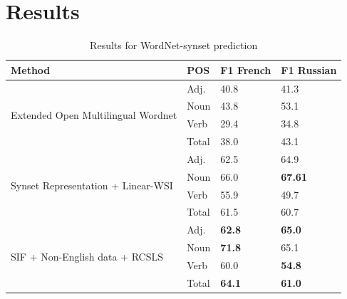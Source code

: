\documentclass[11pt,a4paper]{article}
\begin{document}
\section{Results}

\begin{table}[h]
	\small
	\caption{Results for WordNet-synset prediction}
	\label{wordnet-results}		
	\centering
	\begin{tabular}{l l l l}
		Method & POS & F1 French & F1 Russian
		\\
		\hline
		\multirow{4}{*}{Extended Open Multilingual Wordnet \cite{bond-wordnet}}
		& \multicolumn{1}{l}{Adj.} & \multicolumn{1}{l}{40.8} & \multicolumn{1}{l}{41.3} \\
		& \multicolumn{1}{l}{Noun} & \multicolumn{1}{l}{43.8} & \multicolumn{1}{l}{53.1} \\
		& \multicolumn{1}{l}{Verb} & \multicolumn{1}{l}{29.4} & \multicolumn{1}{l}{34.8} \\
		& \multicolumn{1}{l}{Total} & \multicolumn{1}{l}{38.0} & \multicolumn{1}{l}{43.1} \\
		\hline
		\multirow{4}{*}{Synset Representation + Linear-WSI \cite{Khodak2017}}
		& \multicolumn{1}{l}{Adj.} & \multicolumn{1}{l}{62.5} & \multicolumn{1}{l}{64.9} \\
		& \multicolumn{1}{l}{Noun} & \multicolumn{1}{l}{66.0} & \multicolumn{1}{l}{\textbf{67.61}} \\
		& \multicolumn{1}{l}{Verb} & \multicolumn{1}{l}{55.9} & \multicolumn{1}{l}{49.7} \\
		& \multicolumn{1}{l}{Total} & \multicolumn{1}{l}{61.5} & \multicolumn{1}{l}{60.7} \\
		\hline		
		\hline
		\multirow{4}{*}{SIF + Non-English data + RCSLS}
		& \multicolumn{1}{l}{Adj.} & \multicolumn{1}{l}{\textbf{62.8}} & \multicolumn{1}{l}{\textbf{65.0}} \\
		& \multicolumn{1}{l}{Noun} & \multicolumn{1}{l}{\textbf{71.8}} & \multicolumn{1}{l}{65.1} \\
		& \multicolumn{1}{l}{Verb} & \multicolumn{1}{l}{60.0} & \multicolumn{1}{l}{\textbf{54.8}} \\
		& \multicolumn{1}{l}{Total} & \multicolumn{1}{l}{\textbf{64.1}} & \multicolumn{1}{l}{\textbf{61.0}} \\
		

\end{tabular}
\end{table}
\end{document}
